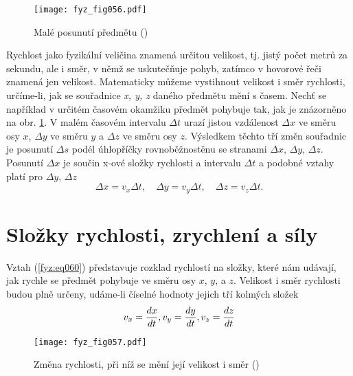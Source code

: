 {    \begin{figure}[ht!]  %
      \centering
      \texttt{[image: fyz\_fig056.pdf]}
      \caption{Malé posunutí předmětu (\cite[s.~124]{Feynman01})}
      \label{fyz:fig056}
    \end{figure}
    
    Rychlost jako fyzikální veličina znamená určitou velikost, tj. jistý počet metrů za sekundu, 
    ale i směr, v němž se uskutečňuje pohyb, zatímco v hovorové řeči znamená jen velikost. 
    Matematicky můžeme vystihnout velikost i směr rychlosti, určíme-li, jak se souřadnice \emph{x, 
    y, z} daného předmětu mění s časem. Nechť se například v určitém časovém okamžiku předmět 
    pohybuje tak, jak je znázorněno na obr. \ref{fyz:fig056}. V malém časovém intervalu \(\Delta 
    t\) urazí jistou vzdálenost \(\Delta x\) ve směru osy \(x\), \(\Delta y\) ve směru \(y\) a 
    \(\Delta z\) ve směru osy \(z\). Výsledkem těchto tří změn souřadnic je posunutí \(\Delta s\) 
    podél úhlopříčky rovnoběžnostěnu se stranami \(\Delta x\), \(\Delta y\), \(\Delta z\). Posunutí 
    \(\Delta x\) je součin x-ové složky rychlosti a intervalu \(\Delta t\) a podobné vztahy platí 
    pro \(\Delta y\), \(\Delta z\)
    \begin{equation}\label{fyz:eq060}
      \Delta x = v_x\Delta t,\quad \Delta y = v_y\Delta t,\quad \Delta z = v_z\Delta t.
    \end{equation}
    
  \section{Složky rychlosti, zrychlení a síly}\label{fyz:IchapIXsecIII}
    Vztah (\ref{fyz:eq060}) představuje rozklad rychlostí na složky, které nám udávají, jak rychle 
    se předmět pohybuje ve směru osy \(x\), \(y\), a \(z\). Velikost i směr rychlosti budou plně 
    určeny, udáme-li číselné hodnoty jejich tří kolmých složek
    \begin{equation}\label{fyz:eq061}
      v_x = \frac{d x}{d t}, v_y = \frac{d y}{d t}, v_z = \frac{d z}{d t}
    \end{equation}

    \begin{figure}[ht!]  %
      \centering
      \texttt{[image: fyz\_fig057.pdf]}
      \caption{ Změna rychlosti, při níž se mění její velikost i směr (\cite[s.~125]{Feynman01})}
      \label{fyz:fig057}
    \end{figure}
    
}
